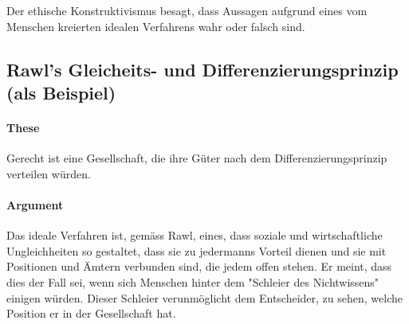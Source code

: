 \documentclass[../main.tex]{subfiles}
\begin{document}
\begin{warningbox}
Der ethische Konstruktivismus besagt, dass Aussagen aufgrund eines vom Menschen kreierten idealen Verfahrens wahr oder falsch sind. 
\end{warningbox}

\subsection{Rawl's Gleicheits- und Differenzierungsprinzip (als Beispiel)}

\paragraph{These} Gerecht ist eine Gesellschaft, die ihre Güter nach dem Differenzierungsprinzip verteilen würden.

\paragraph{Argument} 
Das ideale Verfahren ist, gemäss Rawl, eines, dass soziale und wirtschaftliche Ungleichheiten so gestaltet, dass sie zu jedermanns Vorteil dienen und sie mit Positionen und Ämtern verbunden sind, die jedem offen stehen. Er meint, dass dies der Fall sei, wenn sich Menschen hinter dem "Schleier des Nichtwissens" einigen würden. Dieser Schleier verunmöglicht dem Entscheider, zu sehen, welche Position er in der Gesellschaft hat.
\end{document}
